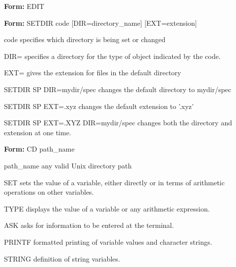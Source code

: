 {\newpage\clearpage
{}%
\begin{command}
  \item[\textbf{Form: }EDIT\hfill]{}
\end{command}%
\lthtmlfigureZ
\lthtmlcheckvsize\clearpage}

{\newpage\clearpage
{}%
\begin{command}
  \item[\textbf{Form: } SETDIR code {[DIR=directory\_name]} 
       {[EXT=extension]}\hfill]{}
  \item[code]{specifies which directory is being set or changed}
  \item[DIR= ]{   specifies a directory for the type of object
       indicated by the code.}
  \item[EXT=]{gives the extension for files in the default directory}
\end{command}%
\lthtmlfigureZ
\lthtmlcheckvsize\clearpage}

{\newpage\clearpage
{}%
\begin{example}
  \item[SETDIR SP DIR=mydir/spec\hfill]{changes the default directory
       to mydir/spec}
  \item[SETDIR SP EXT=.xyz\hfill]{changes the default extension to '.xyz'}
  \item[SETDIR SP EXT=.XYZ DIR=mydir/spec\hfill]{changes both the
       directory and extension at one time.}
\end{example}%
\lthtmlfigureZ
\lthtmlcheckvsize\clearpage}

{\newpage\clearpage
{}%
\begin{command} 
  \item[\textbf{Form: } CD path\_name\hfill]{}
  \item[path\_name]{any valid Unix directory path}
\end{command}%
\lthtmlfigureZ
\lthtmlcheckvsize\clearpage}

{\newpage\clearpage
{}%
\begin{example}
  \item[SET\hfill]{sets the value of a variable, either directly or in
       terms of arithmetic operations on other variables.}
\par\item[TYPE\hfill]{displays the value of a variable or any arithmetic
       expression.}
\par\item[ASK\hfill]{asks for information to be entered at the terminal.}
\par\item[PRINTF\hfill]{formatted printing of variable values and character
       strings.}
\par\item[STRING\hfill]{definition of string variables.}
\end{example}%
\lthtmlfigureZ
\lthtmlcheckvsize\clearpage}


